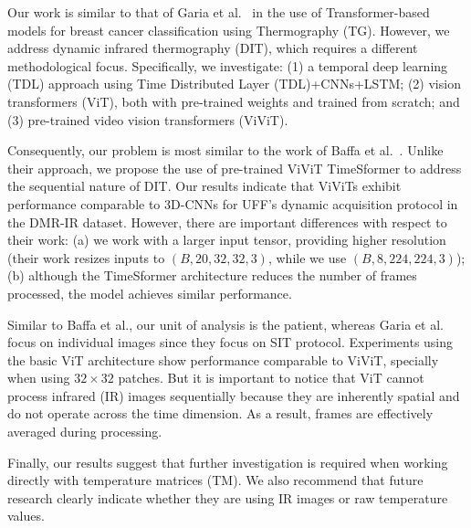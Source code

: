 \documentclass[runningheads]{llncs}
\begin{document}
Our work is similar to that of Garia et al.~\cite{Garia2023} in the
use of Transformer-based models for breast cancer classification using
Thermography (\ac{TG}). However, we address dynamic infrared thermography
(\ac{DIT}), which requires a different methodological
focus. Specifically, we investigate: (1) a temporal deep learning
(\ac{TDL}) approach using Time Distributed Layer
(\ac{TDL})+\ac{CNNs}+\ac{LSTM}; (2) vision transformers (\ac{ViT}),
both with pre-trained weights and trained from scratch; and (3)
pre-trained video vision transformers (\ac{ViViT}).

Consequently, our problem is most similar to the work of Baffa et
al.~\cite{DeMatheus2023}. Unlike their approach, we propose the use of
pre-trained \ac{ViViT} TimeSformer to address the sequential nature of
\ac{DIT}. Our results indicate that \ac{ViViTs} exhibit performance
comparable to 3D-\ac{CNNs} for UFF's dynamic acquisition protocol in the
DMR-IR dataset. However, there are important differences with respect to
their work: (a) we work with a larger input tensor, providing higher
resolution (their work resizes inputs to $(B, 20, 32, 32, 3)$, while
we use $(B, 8, 224, 224, 3)$); (b) although the TimeSformer
architecture reduces the number of frames processed, the model
achieves similar performance.

Similar to Baffa et al., our unit of analysis is the patient, whereas
Garia et al. focus on individual images since they focus on \ac{SIT}
protocol. Experiments using the basic \ac{ViT} architecture show
performance comparable to \ac{ViViT}, specially when using
$32\times 32$ patches. But it is important to notice that \ac{ViT}
cannot process infrared (\ac{IR}) images sequentially because they are
inherently spatial and do not operate across the time dimension. As a
result, frames are effectively averaged during processing.

Finally, our results suggest that further investigation is required
when working directly with temperature matrices (\ac{TM}). We also
recommend that future research clearly indicate whether they are using
\ac{IR} images or raw temperature values.
\end{document}
